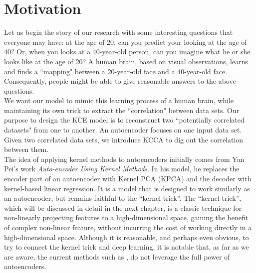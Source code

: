 \documentclass[12pt]{report} %
\begin{document}
\section{Motivation}
Let us begin the story of our research with some interesting questions that everyone may have: at the age of 20, can you predict your looking at the age of 40? Or, when you looks at a 40-year-old person, can you imagine what he or she looks like at the age of 20? A human brain, based on visual observations, learns and finds a ``mapping" between a 20-year-old face and a 40-year-old face. Consequently, people might be able to give reasonable answers to the above questions.\\
We want our model to mimic this learning process of a human brain, while maintaining its own trick to extract the ``correlation" between data sets. Our purpose to design the KCE model is to reconstruct two ``potentially correlated datasets" from one to another. An autoencoder focuses on one input data set. Given two correlated data sets, we introduce KCCA to dig out the correlation between them. \\
The idea of applying kernel methods to autoencoders initially comes from Yan Pei's work \textit{Auto-encoder Using Kernel Methods}\cite{AUKM}. In his model, he replaces the encoder part of an autoencoder with Kernel PCA (KPCA)\cite{KPCA} and the decoder with kernel-based linear regression. It is a model that is designed to work similarly as an autoencoder, but remains faithful to the ``kernel trick''. The ``kernel trick'', which will be discussed in detail in the next chapter, is a classic technique for non-linearly projecting features to a high-dimensional space, gaining the benefit of complex non-linear feature, without incurring the cost of working directly in a high-dimensional space. Although it is reasonable, and perhaps even obvious, to try to connect the kernel trick and deep learning, it is notable that, as far as we are aware, the current methods such as \cite{AUKM}, do not leverage the full power of autoencoders.\\
\end{document}
